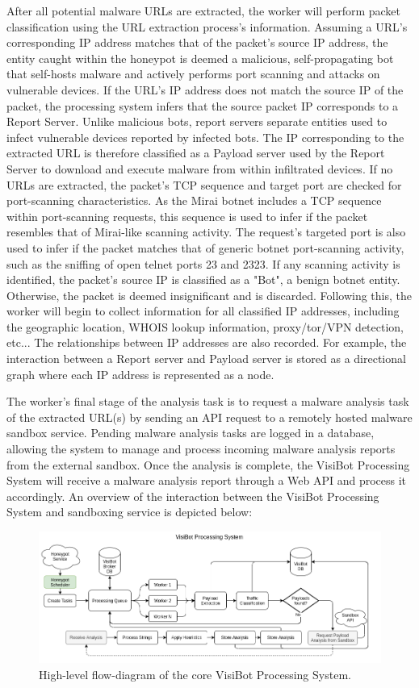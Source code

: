 After all potential malware URLs are extracted, the worker will perform packet classification using the URL extraction process's information. Assuming a URL's corresponding IP address matches that of the packet's source IP address, the entity caught within the honeypot is deemed a malicious, self-propagating bot that self-hosts malware and actively performs port scanning and attacks on vulnerable devices. If the URL's IP address does not match the source IP of the packet, the processing system infers that the source packet IP corresponds to a Report Server. Unlike malicious bots, report servers separate entities used to infect vulnerable devices reported by infected bots. The IP corresponding to the extracted URL is therefore classified as a Payload server used by the Report Server to download and execute malware from within infiltrated devices. If no URLs are extracted, the packet's TCP sequence and target port are checked for port-scanning characteristics. As the Mirai botnet includes a TCP sequence within port-scanning requests, this sequence is used to infer if the packet resembles that of Mirai-like scanning activity. The request's targeted port is also used to infer if the packet matches that of generic botnet port-scanning activity, such as the sniffing of open telnet ports 23 and 2323. If any scanning activity is identified, the packet's source IP is classified as a "Bot", a benign botnet entity. Otherwise, the packet is deemed insignificant and is discarded. Following this, the worker will begin to collect information for all classified IP addresses, including the geographic location, WHOIS lookup information, proxy/tor/VPN detection, etc... The relationships between IP addresses are also recorded. For example, the interaction between a Report server and Payload server is stored as a directional graph where each IP address is represented as a node.

The worker's final stage of the analysis task is to request a malware analysis task of the extracted URL(s) by sending an API request to a remotely hosted malware sandbox service. Pending malware analysis tasks are logged in a database, allowing the system to manage and process incoming malware analysis reports from the external sandbox. Once the analysis is complete, the VisiBot Processing System will receive a malware analysis report through a Web API and process it accordingly. An overview of the interaction between the VisiBot Processing System and sandboxing service is depicted below:

\begin{figure}[!htb]
    \centering
    \includegraphics[width=0.8\linewidth]{flowcharts/high_level_processing_overview.png}
    \caption{High-level flow-diagram of the core VisiBot Processing System.}
    \label{fig:high_level_proc_overview} 
\end{figure}

